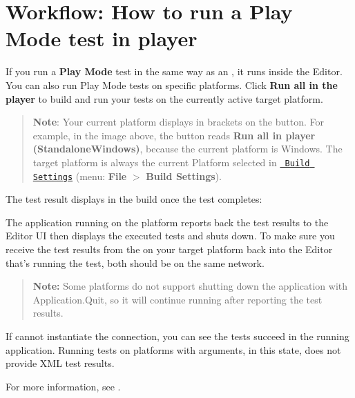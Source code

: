 \chapter{Workflow\+: How to run a Play Mode test in player}
\hypertarget{md__hey_tea_9_2_library_2_package_cache_2com_8unity_8test-framework_0d1_81_833_2_documentation_067b7200309be97aaf3a215eb01c30ccc}{}\label{md__hey_tea_9_2_library_2_package_cache_2com_8unity_8test-framework_0d1_81_833_2_documentation_067b7200309be97aaf3a215eb01c30ccc}
\label{md__hey_tea_9_2_library_2_package_cache_2com_8unity_8test-framework_0d1_81_833_2_documentation_067b7200309be97aaf3a215eb01c30ccc_autotoc_md4389}%
%
 If you run a {\bfseries{Play Mode}} test in the same way as an , it runs inside the  Editor. You can also run Play Mode tests on specific platforms. Click {\bfseries{Run all in the player}} to build and run your tests on the currently active target platform.



\begin{quote}
{\bfseries{Note}}\+: Your current platform displays in brackets on the button. For example, in the image above, the button reads {\bfseries{Run all in player (Standalone\+Windows)}}, because the current platform is Windows. The target platform is always the current Platform selected in \href{https://docs.unity3d.com/Manual/BuildSettings.html}{\texttt{ Build Settings}} (menu\+: {\bfseries{File}} \texorpdfstring{$>$}{>} {\bfseries{Build Settings}}). \end{quote}


The test result displays in the build once the test completes\+:



The application running on the platform reports back the test results to the Editor UI then displays the executed tests and shuts down. To make sure you receive the test results from the  on your target platform back into the Editor that’s running the test, both should be on the same network.

\begin{quote}
{\bfseries{Note\+:}} Some platforms do not support shutting down the application with {\ttfamily Application.\+Quit}, so it will continue running after reporting the test results. \end{quote}


If  cannot instantiate the connection, you can see the tests succeed in the running application. Running tests on platforms with arguments, in this state, does not provide XML test results.

For more information, see . 